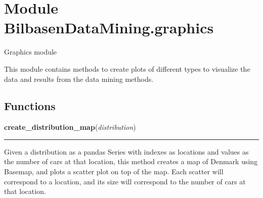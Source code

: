 %
%
%


\section{Module BilbasenDataMining.graphics}

    \label{BilbasenDataMining:graphics}
Graphics module

This module contains methods to create plots of different types to 
visualize the data and results from the data mining methods.



  \subsection{Functions}

    \label{BilbasenDataMining:graphics:create_distribution_map}

    \vspace{0.5ex}

\hspace{.8\funcindent}\begin{boxedminipage}{\funcwidth}

    \raggedright \textbf{create\_distribution\_map}(\textit{distribution})

    \vspace{-1.5ex}

    \rule{\textwidth}{0.5\fboxrule}
\setlength{\parskip}{2ex}
    Given a distribution as a pandas Series with indexes as locations and 
    values as the number of cars at that location, this method creates a 
    map of Denmark using Basemap, and plots a scatter plot on top of the 
    map. Each scatter will correspond to a location, and its size will 
    correspond to the number of cars at that location.

\setlength{\parskip}{1ex}
    \end{boxedminipage}

